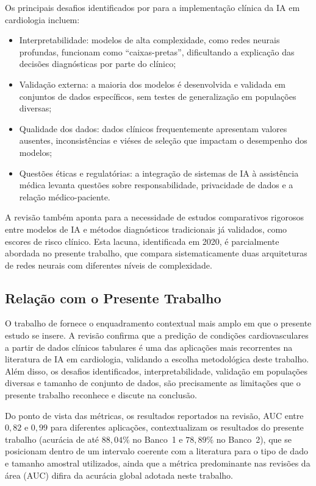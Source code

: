 Os principais desafios identificados por  para a implementa\c c\~ao cl\'inica da IA em cardiologia incluem:

\begin{itemize}
  \item Interpretabilidade: modelos de alta complexidade, como redes neurais profundas, funcionam como ``caixas-pretas'', dificultando a explica\c c\~ao das decis\~oes diagn\'osticas por parte do cl\'inico;
  \item Valida\c c\~ao externa: a maioria dos modelos \'e desenvolvida e validada em conjuntos de dados espec\'ificos, sem testes de generaliza\c c\~ao em popula\c c\~oes diversas;
  \item Qualidade dos dados: dados cl\'inicos frequentemente apresentam valores ausentes, inconsist\^encias e vi\'eses de sele\c c\~ao que impactam o desempenho dos modelos;
  \item Quest\~oes \'eticas e regulat\'orias: a integra\c c\~ao de sistemas de IA \`a assist\^encia m\'edica levanta quest\~oes sobre responsabilidade, privacidade de dados e a rela\c c\~ao m\'edico-paciente.
\end{itemize}

A revis\~ao tamb\'em aponta para a necessidade de estudos comparativos rigorosos entre modelos de IA e m\'etodos diagn\'osticos tradicionais j\'a validados, como escores de risco cl\'inico. Esta lacuna, identificada em 2020, \'e parcialmente abordada no presente trabalho, que compara sistematicamente duas arquiteturas de redes neurais com diferentes n\'iveis de complexidade.

\subsection{Rela\c c\~ao com o Presente Trabalho}

O trabalho de  fornece o enquadramento contextual mais amplo em que o presente estudo se insere. A revis\~ao confirma que a predi\c c\~ao de condi\c c\~oes cardiovasculares a partir de dados cl\'inicos tabulares \'e uma das aplica\c c\~oes mais recorrentes na literatura de IA em cardiologia, validando a escolha metodol\'ogica deste trabalho. Al\'em disso, os desafios identificados, interpretabilidade, valida\c c\~ao em popula\c c\~oes diversas e tamanho de conjunto de dados, s\~ao precisamente as limita\c c\~oes que o presente trabalho reconhece e discute na conclus\~ao.

Do ponto de vista das m\'etricas, os resultados reportados na revis\~ao, AUC entre $0{,}82$ e $0{,}99$ para diferentes aplica\c c\~oes, contextualizam os resultados do presente trabalho (acur\'acia de at\'e $88{,}04\%$ no Banco~1 e $78{,}89\%$ no Banco~2), que se posicionam dentro de um intervalo coerente com a literatura para o tipo de dado e tamanho amostral utilizados, ainda que a m\'etrica predominante nas revis\~oes da \'area (AUC) difira da acur\'acia global adotada neste trabalho.


